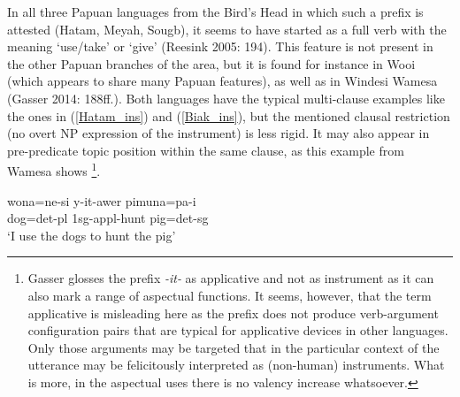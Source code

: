 In all three Papuan languages from the Bird's Head in which such a prefix is attested (Hatam, Meyah, Sougb), it seems to have started as a full verb with the meaning `use/take' or `give' (Reesink 2005: 194). This feature is not present in the other Papuan branches of the area, but it is found for instance in Wooi (which appears to share many Papuan features), as well as in Windesi Wamesa (Gasser 2014: 188ff.). Both languages have the typical multi-clause examples like the ones in (\ref{Hatam_ins}) and (\ref{Biak_ins}), but the mentioned clausal restriction (no overt NP expression of the instrument) is less rigid. It may also appear in pre-predicate topic position within the same clause, as this example from Wamesa shows \footnote{Gasser glosses the prefix \textit{-it-} as applicative and not as instrument as it can also mark a range of aspectual functions. It seems, however, that the term applicative is misleading here as the prefix does not produce verb-argument configuration pairs that are typical for applicative devices in other languages. Only those arguments may be targeted that in the particular context of the utterance may be felicitously interpreted as (non-human) instruments. What is more, in the aspectual uses there is no valency increase whatsoever.}.

\ea 
\gll wona=ne-si y-it-awer pimuna=pa-i \\
dog=\acs{det}-\acs{pl} \acs{1}\acs{sg}-\acs{appl}-hunt pig=\acs{det}-\acs{sg} \\
\glft `I use the dogs to hunt the pig' \\ 
\z
\xe

